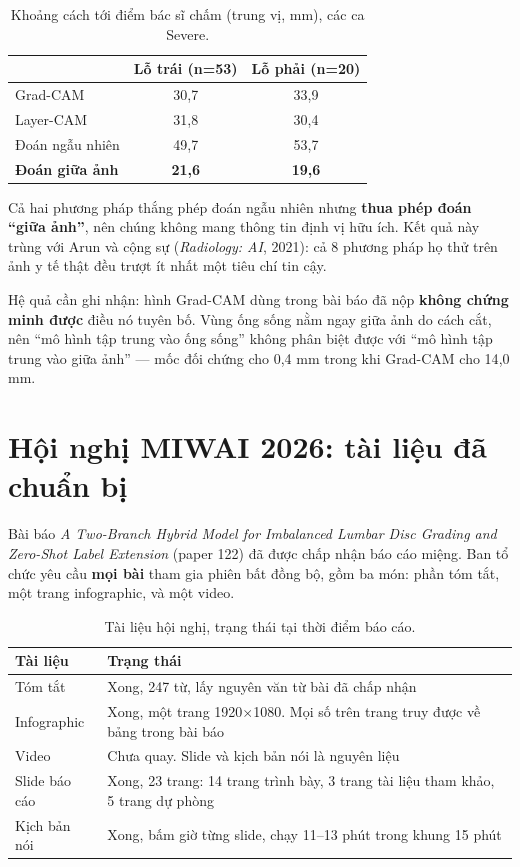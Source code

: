 \documentclass[11pt,a4paper]{article}
\newcommand{\down}[1]{\textcolor{red!65!black}{#1}}
\begin{document}
\begin{table}[htbp]
\centering\small
\caption{Khoảng cách tới điểm bác sĩ chấm (trung vị, mm), các ca Severe.}
\label{tab:loc}
\begin{tabular}{lcc}
\toprule
 & \textbf{Lỗ trái (n=53)} & \textbf{Lỗ phải (n=20)} \\
\midrule
Grad-CAM              & 30{,}7 & 33{,}9 \\
Layer-CAM             & 31{,}8 & 30{,}4 \\
Đoán ngẫu nhiên       & 49{,}7 & 53{,}7 \\
\textbf{Đoán giữa ảnh} & \textbf{21{,}6} & \textbf{19{,}6} \\
\bottomrule
\end{tabular}
\end{table}

Cả hai phương pháp thắng phép đoán ngẫu nhiên nhưng \textbf{thua phép đoán ``giữa ảnh''}, nên chúng
không mang thông tin định vị hữu ích. Kết quả này trùng với Arun và cộng sự (\textit{Radiology: AI},
2021): cả 8 phương pháp họ thử trên ảnh y tế thật đều trượt ít nhất một tiêu chí tin cậy.

Hệ quả cần ghi nhận: hình Grad-CAM dùng trong bài báo đã nộp \textbf{không chứng minh được} điều nó
tuyên bố. Vùng ống sống nằm ngay giữa ảnh do cách cắt, nên ``mô hình tập trung vào ống sống'' không
phân biệt được với ``mô hình tập trung vào giữa ảnh'' --- mốc đối chứng cho 0{,}4 mm trong khi
Grad-CAM cho 14{,}0 mm.

\section{Hội nghị MIWAI 2026: tài liệu đã chuẩn bị}

Bài báo \textit{A Two-Branch Hybrid Model for Imbalanced Lumbar Disc Grading and Zero-Shot Label
Extension} (paper 122) đã được chấp nhận báo cáo miệng. Ban tổ chức yêu cầu \textbf{mọi bài} tham
gia phiên bất đồng bộ, gồm ba món: phần tóm tắt, một trang infographic, và một video.

\begin{table}[htbp]
\centering\small
\caption{Tài liệu hội nghị, trạng thái tại thời điểm báo cáo.}
\label{tab:miwai}
\begin{tabular}{@{}lp{9.4cm}@{}}
\toprule
\textbf{Tài liệu} & \textbf{Trạng thái} \\
\midrule
Tóm tắt & Xong, 247 từ, lấy nguyên văn từ bài đã chấp nhận \\
Infographic & Xong, một trang 1920$\times$1080. Mọi số trên trang truy được về bảng trong bài báo \\
Video & \down{Chưa quay.} Slide và kịch bản nói là nguyên liệu \\
Slide báo cáo & Xong, 23 trang: 14 trang trình bày, 3 trang tài liệu tham khảo, 5 trang dự phòng \\
Kịch bản nói & Xong, bấm giờ từng slide, chạy 11--13 phút trong khung 15 phút \\
\bottomrule
\end{tabular}
\end{table}
\end{document}
